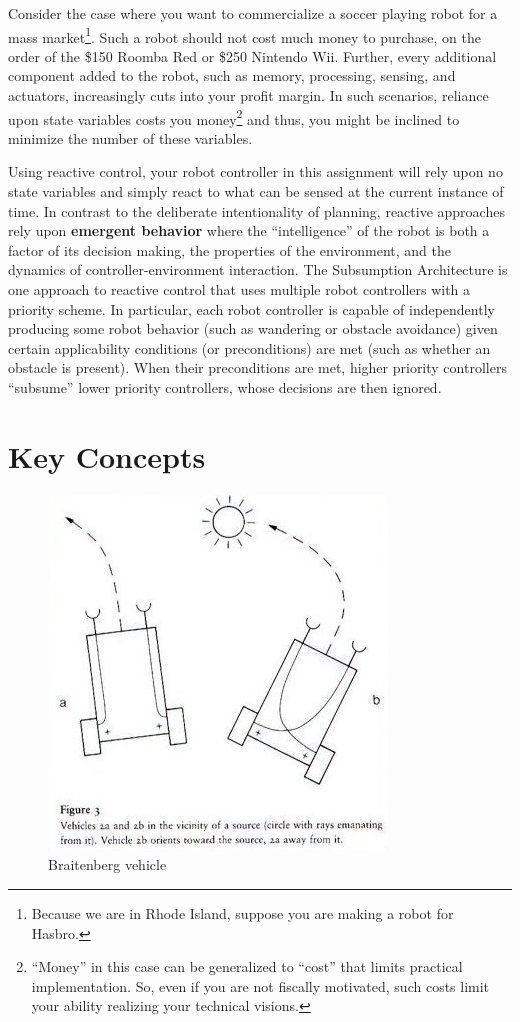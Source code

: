Consider the case where you want to commercialize a soccer playing robot for a mass market\footnote{Because we are in Rhode Island, suppose you are making a robot for Hasbro.}.  Such a robot should not cost much money to purchase, on the order of the \$150 Roomba Red or \$250 Nintendo Wii.  Further, every additional component added to the robot, such as memory, processing, sensing, and actuators, increasingly cuts into your profit margin.  In such scenarios, reliance upon state variables costs you money\footnote{``Money'' in this case can be generalized to ``cost'' that limits practical implementation.  So, even if you are not fiscally motivated, such costs limit your ability realizing your technical visions.} and thus, you might be inclined to minimize the number of these variables.

Using reactive control, your robot controller in this assignment will rely upon no state variables and simply react to what can be sensed at the current instance of time.  In contrast to the deliberate intentionality of planning, reactive approaches rely upon {\bf emergent behavior} where the ``intelligence'' of the robot is both a factor of its decision making, the properties of the environment, and the dynamics of controller-environment interaction.  The Subsumption Architecture is one approach to reactive control that uses multiple robot controllers with a priority scheme.  In particular, each robot controller is capable of independently producing some robot behavior (such as wandering or obstacle avoidance) given certain applicability conditions (or preconditions) are met (such as whether an obstacle is present).  When their preconditions are met, higher priority controllers ``subsume''  lower priority controllers, whose decisions are then ignored.

\section{Key Concepts}

\begin{figure}[!h]
\centering
\includegraphics[width=0.5\columnwidth]{figures/9_embodied_intel.jpg}
\caption{Braitenberg vehicle}
\end{figure}

